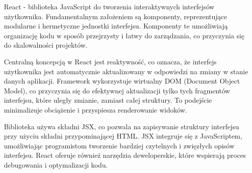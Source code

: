 React - biblioteka JavaScript do tworzenia interaktywnych interfejsów użytkownika. Fundamentalnym założeniem są komponenty, reprezentujące modularne i hermetyczne jednostki interfejsu. Komponenty te umożliwiają organizację kodu w sposób przejrzysty i łatwy do zarządzania, co przyczynia się do skalowalności projektów. \autocite{react}

Centralną koncepcją w React jest reaktywność, co oznacza, że interfejs użytkownika jest automatycznie aktualizowany w odpowiedzi na zmiany w stanie danych aplikacji. Framework wykorzystuje wirtualny DOM (Document Object Model), co przyczynia się do efektywnej aktualizacji tylko tych fragmentów interfejsu, które uległy zmianie, zamiast całej struktury. To podejście minimalizuje obciążenie i przyspiesza renderowanie widoków.

Biblioteka używa składni JSX, co pozwala na zapisywanie struktury interfejsu przy użyciu składni przypominającej HTML. JSX integruje się z JavaScriptem, umożliwiając programistom tworzenie bardziej czytelnych i zwięzłych opisów interfejsu. React oferuje również narzędzia deweloperskie, które wspierają proces debugowania i optymalizacji kodu.